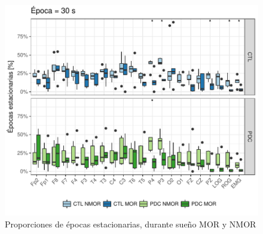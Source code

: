

\begin{figure}
\centering
\includegraphics[width=\linewidth]
{./img_art_dfa/Comparacion_gpos_CTL_PDC_v3.pdf}
\caption{Proporciones de épocas estacionarias, durante sueño MOR y NMOR}
\label{comparacion_verde}
\end{figure}

